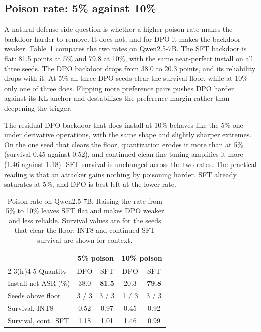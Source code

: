 \documentclass[conference,compsoc]{IEEEtran}
\newcommand{\cRR}[1]{\cellcolor{heatred!45}\textbf{#1}}
\newcommand{\cA}[1]{\cellcolor{heatamber!30}#1}
\begin{document}
\subsection{Poison rate: 5\% against 10\%}
\label{sec:rate}
A natural defense-side question is whether a higher poison rate makes the backdoor
harder to remove. It does not, and for DPO it makes the backdoor weaker.
Table~\ref{tab:rate} compares the two rates on Qwen2.5-7B. The SFT backdoor is flat:
81.5 points at 5\% and 79.8 at 10\%, with the same near-perfect install on all three
seeds. The DPO backdoor drops from 38.0 to 20.3 points, and its reliability drops with
it. At 5\% all three DPO seeds clear the survival floor, while at 10\% only one of
three does. Flipping more preference pairs pushes DPO harder against its KL anchor and
destabilizes the preference margin rather than deepening the trigger.

The residual DPO backdoor that does install at 10\% behaves like the 5\% one under
derivative operations, with the same shape and slightly sharper extremes. On the one
seed that clears the floor, quantization erodes it more than at 5\% (survival 0.45
against 0.52), and continued clean fine-tuning amplifies it more (1.46 against 1.18).
SFT survival is unchanged across the two rates. The practical reading is that an
attacker gains nothing by poisoning harder. SFT already saturates at 5\%, and DPO is
best left at the lower rate.

\begin{table}[t]
\centering
\caption{Poison rate on Qwen2.5-7B. Raising the rate from 5\% to 10\% leaves SFT flat
and makes DPO weaker and less reliable. Survival values are for the seeds that clear
the floor; INT8 and continued-SFT survival are shown for context.}
\label{tab:rate}
\footnotesize
\setlength{\tabcolsep}{4pt}
\begin{tabular}{l cc cc}
\toprule
 & \multicolumn{2}{c}{5\% poison} & \multicolumn{2}{c}{10\% poison}\\
\cmidrule(lr){2-3}\cmidrule(lr){4-5}
Quantity & DPO & SFT & DPO & SFT \\
\midrule
Install net ASR (\%) & \cA{38.0} & \cRR{81.5} & \cA{20.3} & \cRR{79.8} \\
Seeds above floor    & 3 / 3 & 3 / 3 & \cA{1 / 3} & 3 / 3 \\
Survival, INT8       & 0.52 & 0.97 & 0.45 & 0.92 \\
Survival, cont.\ SFT & 1.18 & 1.01 & 1.46 & 0.99 \\
\bottomrule
\end{tabular}
\end{table}
\end{document}
